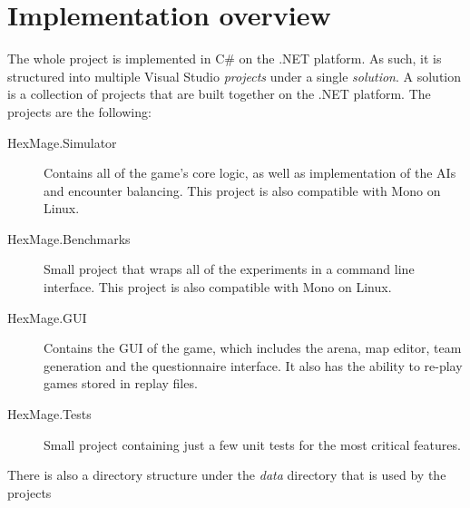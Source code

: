\chapter{Implementation overview}
\label{implementation-overview}

The whole project is implemented in C\# on the .NET platform. As such, it is structured
into multiple Visual Studio \emph{projects} under a single \emph{solution}. A solution is a collection
of projects that are built together on the .NET platform. The projects are
the following:


\begin{description}
	\item[HexMage.Simulator] Contains all of the game's core logic, as well as implementation of the AIs
		and encounter balancing. This project is also compatible with Mono on Linux.
	\item[HexMage.Benchmarks] Small project that wraps all of the experiments in a command line interface.
		This project is also compatible with Mono on Linux.
	\item[HexMage.GUI] Contains the GUI of the game, which includes the arena, map editor, team generation
		and the questionnaire interface. It also has the ability to re-play games stored in replay files.
	\item[HexMage.Tests] Small project containing just a few unit tests for the most critical features.
\end{description}

There is also a directory structure under the \emph{data} directory that is used by the projects

